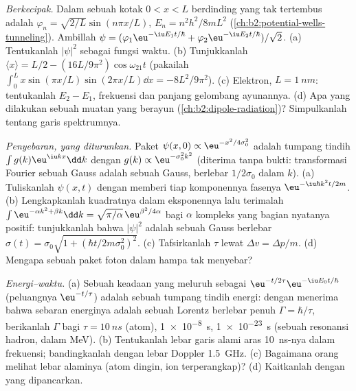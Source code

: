 \begin{exercise}[$\star\star\star$]\label{exo:b2:schrodinger-wave-functions:10}
\emph{Berkecipak.} Dalam sebuah kotak $0 < x < L$ berdinding yang tak tertembus
 adalah $\varphi_n = \sqrt{2/L}\sin(n\pi x/L)$, $E_n =
n^2h^2/8mL^2$ (\cref{ch:b2:potential-wells-tunneling}). Ambillah $\psi =
(\varphi_1\eu^{-\iu E_1t/\hbar} + \varphi_2\eu^{-\iu E_2t/\hbar})/\sqrt2$. (a)
Tentukanlah $|\psi|^2$ sebagai fungsi waktu. (b) Tunjukkanlah $\langle x\rangle = L/2 -
(16L/9\pi^2)\cos\omega_{21}t$ (pakailah $\int_0^L x\sin(\pi x/L)\sin(2\pi x/L)\dd x
= -8L^2/9\pi^2$). (c) Elektron, $L = \qty{1}{nm}$: tentukanlah $E_2 - E_1$,
frekuensi dan panjang gelombang ayunannya. (d) Apa yang dilakukan sebuah
muatan yang berayun (\cref{ch:b2:dipole-radiation})? Simpulkanlah tentang
garis spektrumnya.
\end{exercise}

\begin{exercise}[$\star\star\star$]\label{exo:b2:schrodinger-wave-functions:11}
\emph{Penyebaran, yang diturunkan.} Paket $\psi(x,0) \propto \eu^{-x^2/4\sigma_0^2}$
adalah tumpang tindih $\int g(k)\eu^{\iu kx}\dd k$ dengan $g(k) \propto
\eu^{-\sigma_0^2k^2}$ (diterima tanpa bukti: transformasi Fourier sebuah Gauss adalah sebuah
Gauss, berlebar $1/2\sigma_0$ dalam $k$). (a) Tuliskanlah $\psi(x,t)$ dengan memberi tiap
komponennya fasenya $\eu^{-\iu\hbar k^2t/2m}$. (b) Lengkapkanlah kuadratnya dalam
eksponennya lalu terimalah $\int\eu^{-\alpha k^2 + \beta k}\dd k = \sqrt{\pi/\alpha}\,
\eu^{\beta^2/4\alpha}$ bagi $\alpha$ kompleks yang bagian nyatanya positif: tunjukkanlah bahwa
$|\psi|^2$ adalah sebuah Gauss berlebar $\sigma(t) = \sigma_0\sqrt{1 + (\hbar t/2m
\sigma_0^2)^2}$. (c) Tafsirkanlah $\tau$ lewat $\Delta v = \Delta p/m$. (d) Mengapa
sebuah paket foton dalam hampa tak menyebar?
\end{exercise}

\begin{exercise}[$\star\star\star$]\label{exo:b2:schrodinger-wave-functions:12}
\emph{Energi--waktu.} (a) Sebuah keadaan yang meluruh sebagai $\eu^{-t/2\tau}\eu^{-\iu E_0t/\hbar}$
(peluangnya $\eu^{-t/\tau}$) adalah sebuah tumpang tindih energi: dengan menerima
bahwa sebaran energinya adalah sebuah Lorentz berlebar penuh $\Gamma =
\hbar/\tau$, berikanlah $\Gamma$ bagi $\tau = \qty{10}{ns}$ (atom), \qty{1e-8}{s},
\qty{1e-23}{s} (sebuah resonansi hadron, dalam MeV). (b) Tentukanlah lebar garis alami
aras \qty{10}{ns}-nya dalam frekuensi; bandingkanlah dengan lebar Doppler
\qty{1.5}{GHz}. (c) Bagaimana orang melihat lebar alaminya (atom dingin,
ion terperangkap)? (d) Kaitkanlah dengan  
yang dipancarkan.
\end{exercise}

